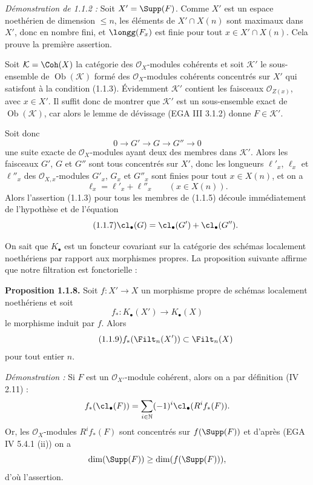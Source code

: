 \emph{Démonstration de 1.1.2 :} Soit $X'=\Supp(F)$. Comme $X'$ est un espace noethérien de dimension $\leq n$, les éléments de $X'\cap X(n)$ sont maximaux dans $X'$, donc en nombre fini, et $\longg(F_x)$ est finie pour tout $x\in X'\cap X(n)$. Cela prouve la première assertion.

Soit $\mathcal K=\Coh(X)$ la catégorie des $\mathcal O_X$-modules cohérents et soit $\mathcal K'$ le sous-ensemble de $\operatorname{Ob}(\mathcal K)$ formé des $\mathcal O_X$-modules cohérents concentrés sur $X'$ qui satisfont à la condition (1.1.3). Évidemment $\mathcal K'$ contient les faisceaux $\mathcal O_{Z(x)}$, avec $x\in X'$. Il suffit donc de montrer que $\mathcal K'$ est un sous-ensemble exact de $\operatorname{Ob}(\mathcal K)$, car alors le lemme de dévissage (EGA III 3.1.2) donne $F\in\mathcal K'$.

Soit donc
\begin{equation}\tag{1.1.5}
0\longrightarrow G'\longrightarrow G\longrightarrow G''\longrightarrow0
\end{equation}
une suite exacte de $\mathcal O_X$-modules ayant deux des membres dans $\mathcal K'$. Alors les faisceaux $G'$, $G$ et $G''$ sont tous concentrés sur $X'$, donc les longueurs $\ell'_x$, $\ell_x$ et $\ell''_x$ des $\mathcal O_{X,x}$-modules $G'_x$, $G_x$ et $G''_x$ sont finies pour tout $x\in X(n)$, et on a
\begin{equation}\tag{1.1.6}
\ell_x=\ell'_x+\ell''_x\qquad (x\in X(n)).
\end{equation}
Alors l'assertion (1.1.3) pour tous les membres de (1.1.5) découle immédiatement de l'hypothèse et de l'équation
\begin{equation}\tag{1.1.7}
\cl_\bullet(G)=\cl_\bullet(G')+\cl_\bullet(G'').
\end{equation}

On sait que $K_\bullet$ est un foncteur covariant sur la catégorie des schémas localement noethériens par rapport aux morphismes propres. La proposition suivante affirme que notre filtration est fonctorielle :

\textbf{Proposition 1.1.8.} Soit $f:X'\to X$ un morphisme propre de schémas localement noethériens et soit
\[
f_*:K_\bullet(X')\longrightarrow K_\bullet(X)
\]
le morphisme induit par $f$. Alors
\begin{equation}\tag{1.1.9}
f_*(\Filt_n(X'))\subset\Filt_n(X)
\end{equation}
pour tout entier $n$.

\emph{Démonstration :} Si $F$ est un $\mathcal O_{X'}$-module cohérent, alors on a par définition (IV 2.11) :
\[
f_*(\cl_\bullet(F))=\sum_{i\in\mathbb N}(-1)^i\cl_\bullet(R^if_*(F)).
\]
Or, les $\mathcal O_X$-modules $R^if_*(F)$ sont concentrés sur $f(\Supp(F))$ et d'après (EGA IV 5.4.1 (ii)) on a
\[
\dim(\Supp(F))\geq\dim(f(\Supp(F))),
\]
d'où l'assertion.

